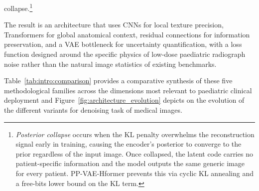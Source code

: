 \documentclass[12pt, a4paper, twoside, openright]{book}
\begin{document}
collapse.\footnote{\emph{Posterior collapse} occurs when the KL penalty overwhelms the reconstruction signal early in training, causing the encoder's posterior to converge to the prior regardless of the input image. Once collapsed, the latent code carries no patient-specific information and the model outputs the same generic image for every patient. PP-VAE-Hformer prevents this via cyclic KL annealing \cite{fu_cyclical_2019} and a free-bits lower bound on the KL term.}

The result is an architecture that uses CNNs for local texture precision, Transformers for global anatomical context, residual connections for information preservation, and a VAE bottleneck for uncertainty quantification, with a loss function designed around the specific physics of low-dose paediatric radiograph noise rather than the natural image statistics of existing benchmarks.

Table~\ref{tab:intro:comparison} provides a comparative synthesis of these five methodological
families across the dimensions most relevant to paediatric clinical deployment and Figure~\ref{fig:architecture_evolution} depicts on the evolution of the different variants for denoising task of medical images.

\renewcommand{\arraystretch}{0.8} %
\end{document}
